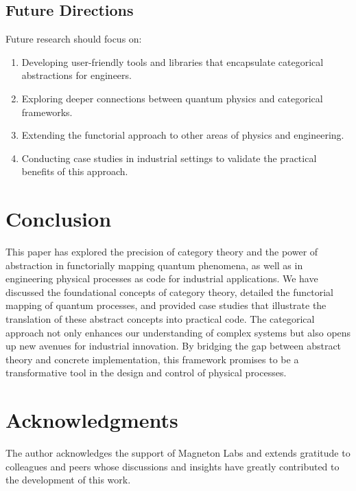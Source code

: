 \documentclass[11pt]{article}
\begin{document}
\subsection{Future Directions}
Future research should focus on:
\begin{enumerate}[label=(\roman*)]
    \item Developing user-friendly tools and libraries that encapsulate categorical abstractions for engineers.
    \item Exploring deeper connections between quantum physics and categorical frameworks.
    \item Extending the functorial approach to other areas of physics and engineering.
    \item Conducting case studies in industrial settings to validate the practical benefits of this approach.
\end{enumerate}

\section{Conclusion}
This paper has explored the precision of category theory and the power of abstraction in functorially mapping quantum phenomena, as well as in engineering physical processes as code for industrial applications. We have discussed the foundational concepts of category theory, detailed the functorial mapping of quantum processes, and provided case studies that illustrate the translation of these abstract concepts into practical code. The categorical approach not only enhances our understanding of complex systems but also opens up new avenues for industrial innovation. By bridging the gap between abstract theory and concrete implementation, this framework promises to be a transformative tool in the design and control of physical processes.

\section*{Acknowledgments}
The author acknowledges the support of Magneton Labs and extends gratitude to colleagues and peers whose discussions and insights have greatly contributed to the development of this work.

\newpage
\end{document}
